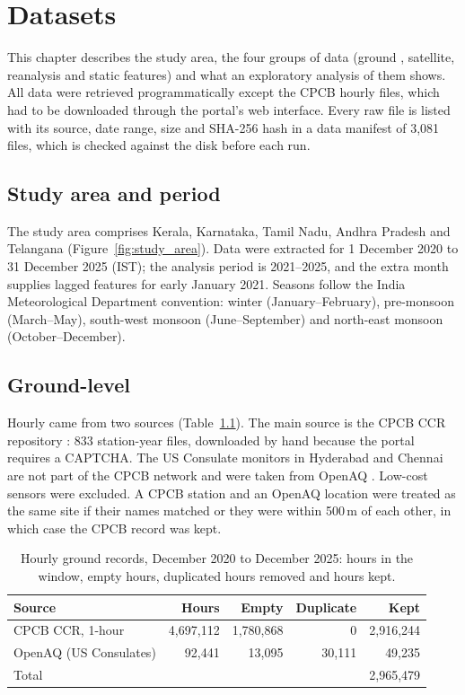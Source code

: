 \chapter{Datasets}

This chapter describes the study area, the four groups of data (ground \pmtf{}, satellite,
reanalysis and static features) and what an exploratory analysis of them shows. All data were
retrieved programmatically except the CPCB hourly files, which had to be downloaded through the
portal's web interface. Every raw file is listed with its source, date range, size and SHA-256
hash in a data manifest of 3,081 files, which is checked against the disk before each run.

\section{Study area and period}

The study area comprises Kerala, Karnataka, Tamil Nadu, Andhra Pradesh and Telangana
(Figure~\ref{fig:study_area}). Data were extracted for 1 December 2020 to 31 December 2025 (IST);
the analysis period is 2021--2025, and the extra month supplies lagged features for early January
2021. Seasons follow the India Meteorological Department convention: winter (January--February),
pre-monsoon (March--May), south-west monsoon (June--September) and north-east monsoon
(October--December).

\section{Ground-level \texorpdfstring{\pmtf{}}{PM2.5}}

Hourly \pmtf{} came from two sources (Table~\ref{tab:ground}). The main source is the CPCB CCR
repository \cite{cpcbccr}: 833 station-year files, downloaded by hand because the portal requires a
CAPTCHA. The US Consulate monitors in Hyderabad and Chennai are not part of the CPCB network and
were taken from OpenAQ \cite{openaq}. Low-cost sensors were excluded. A CPCB station and an OpenAQ
location were treated as the same site if their names matched or they were within 500\,m of each
other, in which case the CPCB record was kept.

\begin{table}[!htbp]
    \centering
    \small
    \setlength{\tabcolsep}{4pt}
    \begin{tabular}{l|r|r|r|r}
        \hline
        Source & Hours & Empty & Duplicate & Kept \\
        \hline
        CPCB CCR, 1-hour & 4,697,112 & 1,780,868 & 0 & 2,916,244 \\
        OpenAQ (US Consulates) & 92,441 & 13,095 & 30,111 & 49,235 \\
        \hline
        Total & & & & 2,965,479 \\
        \hline
    \end{tabular}
    \caption{Hourly ground \pmtf{} records, December 2020 to December 2025: hours in the window, empty hours, duplicated hours removed and hours kept.}
    \label{tab:ground}
\end{table}

